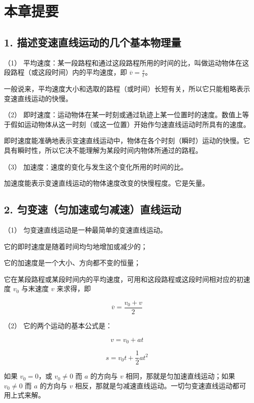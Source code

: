 \section{本章提要}\label{ux672cux7ae0ux63d0ux8981-4}

\subsection{1.
描述变速直线运动的几个基本物理量}\label{ux63cfux8ff0ux53d8ux901fux76f4ux7ebfux8fd0ux52a8ux7684ux51e0ux4e2aux57faux672cux7269ux7406ux91cf}

（1）
平均速度：某一段路程和通过这段路程所用的时间的比，叫做运动物体在这段路程（或这段时间）内的平均速度，即
\(\overline{v} = \frac{s}{t}\)。

一般说来，平均速度大小和选取的路程（或时间）长短有关，所以它只能粗略表示变速直线运动的快慢。

（2）
即时速度：运动物体在某一时刻或通过轨迹上某一位置时的速度。数值上等于假如运动物体从这一时刻（或这一位置）开始作匀速直线运动时所具有的速度。

即时速度能准确地表示变速直线运动中，物体在各个时刻（瞬时）运动的快慢。它具有瞬时性，所以它决不能理解为某段时间内物体所通过的路程。

（3） 加速度：速度的变化与发生这个变化所用的时间的比。

加速度能表示变速直线运动的物体速度改变的快慢程度。它是矢量。

\subsection{2.
匀变速（匀加速或匀减速）直线运动}\label{ux5300ux53d8ux901fux5300ux52a0ux901fux6216ux5300ux51cfux901fux76f4ux7ebfux8fd0ux52a8}

（1） 匀变速直线运动是一种最简单的变速直线运动。

它的即时速度是随着时间均匀地增加或减少的；

它的加速度是一个大小、方向都不变的恒量；

它在某段路程或某段时间内的平均速度，可用和这段路程或这段时间相对应的初速度
\(v_{0}\) 与末速度 \(v\) 来求得，即

\[
\overline {{v}} = \frac {v _ {0} + v}{2}
\]

（2） 它的两个运动的基本公式是：

\[
v = v _ {0} + a t
\]

\[
s = v _ {0} t + \frac {1}{2} a t ^ {2}
\]

如果 \(v_{0} = 0\)，或 \(v_{0} \neq 0\) 而 \(a\) 的方向与 \(v\)
相同，那就是匀加速直线运动；如果 \(v_{0} \neq 0\) 而 \(a\) 的方向与
\(v\) 相反，那就是匀减速直线运动。一切匀变速直线运动都可用上式来解。

